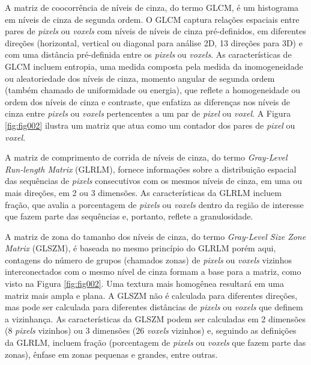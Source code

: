  A matriz de coocorrência de níveis de cinza, do termo \gls{GLCM}, é um histograma em níveis de cinza de segunda ordem. O GLCM captura relações espaciais entre pares de \textit{pixels} ou \textit{voxels} com níveis de níveis de cinza pré-definidos, em diferentes direções (horizontal, vertical ou diagonal para análise 2D, 13 direções para 3D) e com uma distância pré-definida entre os \textit{pixels} ou \textit{voxels}. As características de GLCM incluem entropia, uma medida composta pela medida da inomogeneidade ou aleatoriedade dos níveis de cinza, momento angular de segunda ordem (também chamado de uniformidade ou energia), que reflete a homogeneidade ou ordem dos níveis de cinza e contraste, que enfatiza as diferenças nos níveis de cinza entre \textit{pixels} ou \textit{voxels} pertencentes a um par de \textit{pixel} ou \textit{voxel}. A Figura \ref{fig:fig002} ilustra um matriz que atua como um contador dos pares de \textit{pixel} ou \textit{voxel}.

 A matriz de comprimento de corrida de níveis de cinza, do termo 
 \textit{Gray-Level Run-length Matrix} (GLRLM), fornece informações sobre a distribuição espacial das sequências de \textit{pixels} consecutivos com os mesmos níveis de cinza, em uma ou mais direções, em 2 ou 3 dimensões. As características da GLRLM incluem fração, que avalia a porcentagem de \textit{pixels} ou \textit{voxels} dentro da região de interesse que fazem parte das sequências e, portanto, reflete a granulosidade. 

A matriz de zona do tamanho dos níveis de cinza, do termo \textit{Gray-Level Size Zone Matrix} (GLSZM), é baseada no mesmo princípio do GLRLM porém aqui, contagens do número de grupos (chamados zonas) de \textit{pixels} ou \textit{voxels} vizinhos interconectados com o mesmo nível de cinza formam a base para a matriz, como visto na Figura \ref{fig:fig002}. Uma textura mais homogênea resultará em uma matriz mais ampla e plana. A GLSZM não é calculada para diferentes direções, mas pode ser calculada para diferentes distâncias de \textit{pixels} ou \textit{voxels} que definem a vizinhança. As características da GLSZM podem ser calculadas em 2 dimensões (8 \textit{pixels} vizinhos) ou 3 dimensões (26 \textit{voxels} vizinhos) e, seguindo as definições da GLRLM, incluem fração (porcentagem de \textit{pixels} ou \textit{voxels} que fazem parte das zonas), ênfase em zonas pequenas e grandes, entre outras.


